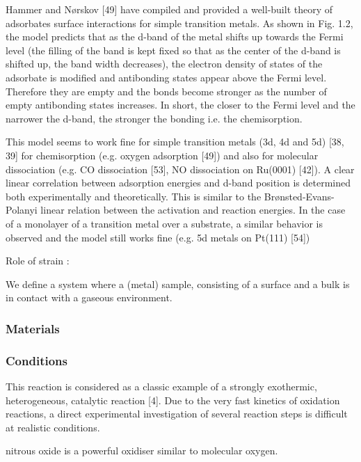 Hammer and Nørskov [49] have compiled and provided a well-built theory of adsorbates
surface interactions for simple transition metals. As shown in Fig. 1.2, the model predicts that as the d-band of the metal shifts up towards the Fermi level (the filling of the band is kept fixed so that as the center of the d-band is shifted up, the band width decreases), the electron density of states of the adsorbate is modified and antibonding states appear above the Fermi level. Therefore they are empty and the bonds become stronger as the number of empty antibonding states increases. In short, the closer to the Fermi level and the narrower the d-band, the stronger the bonding i.e. the chemisorption.

This model seems to work fine for simple transition metals (3d, 4d and 5d) [38, 39] for chemisorption (e.g. oxygen adsorption [49]) and also for molecular dissociation (e.g. CO
dissociation [53], NO dissociation on Ru(0001) [42]). A clear linear correlation between adsorption energies and d-band position is determined both experimentally and theoretically. This is similar to the Brønsted-Evans-Polanyi linear relation between the activation and reaction energies. In the case of a monolayer of a transition metal over a substrate, a similar behavior is observed and the model still works fine (e.g. 5d metals on Pt(111) [54])


Role of strain : 

\cite{Kitchin2004}

\cite{Mavrikakis1998}

We define a system where a (metal) sample, consisting of a surface and a bulk is in contact with a gaseous environment.




\subsubsection{Materials}

\subsubsection{Conditions}

This reaction is considered as a classic example of a strongly exothermic, heterogeneous, catalytic reaction [4]. Due to the very fast kinetics of oxidation reactions, a direct experimental investigation of several reaction steps is difficult at realistic conditions.

nitrous oxide is a powerful oxidiser similar to molecular oxygen. 

